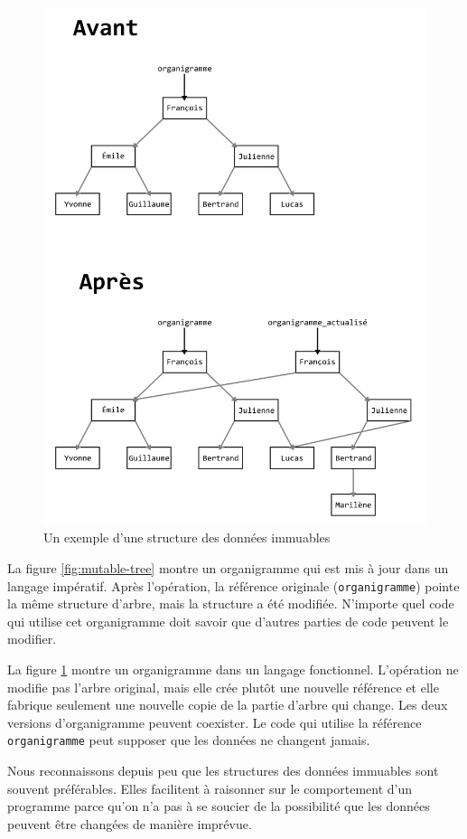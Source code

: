 \documentclass[french]{report}
\begin{document}
\begin{figure}[h]
	\centering
	\includegraphics[width=0.7\linewidth]{immutable_tree}
	\caption{Un exemple d'une structure des données immuables}
	\label{fig:immutable-tree}
\end{figure}

La figure \ref{fig:mutable-tree} montre un organigramme qui est mis à jour dans un langage impératif. Après l'opération, la référence originale (\texttt{organigramme}) pointe la même structure d'arbre, mais la structure a été modifiée. N'importe quel code qui utilise cet organigramme doit savoir que d'autres parties de code peuvent le modifier.

La figure \ref{fig:immutable-tree} montre un organigramme dans un langage fonctionnel. L'opération ne modifie pas l'arbre original, mais elle crée plutôt une nouvelle référence et elle fabrique seulement une nouvelle copie de la partie d'arbre qui change. Les deux versions d'organigramme peuvent coexister. Le code qui utilise la référence \texttt{organigramme} peut supposer que les données ne changent jamais.

Nous reconnaissons depuis peu que les structures des données immuables sont souvent préférables. Elles facilitent à raisonner sur le comportement d'un programme parce qu'on n'a pas à se soucier de la possibilité que les données peuvent être changées de manière imprévue.
\end{document}
